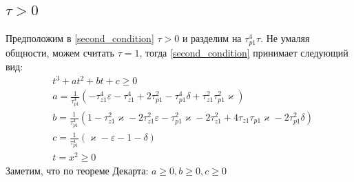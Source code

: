\documentclass[a4paper]{article}
\begin{document}
\subsection{$\tau > 0$}
Предположим в \eqref{second_condition} $\tau > 0$ и разделим на $\tau_{p1}^4\tau$. Не умаляя общности, можем считать $\tau = 1$, тогда \eqref{second_condition} принимает следующий вид:
 \begin{equation}
 \begin{aligned}
&t^3 +at^2 +bt + c  \geq 0\\
&a = \frac{1}{\tau_{p1}^4}(- \tau_{z1}^4\varepsilon - \tau_{z1}^4 + 2\tau_{p1}^2- \tau_{p1}^4\delta + \tau_{z1}^2\tau_{p1}^2\varkappa)\\
&b = \frac{1}{\tau_{p1}^4}( 1- \tau_{z1}^2\varkappa - 2\tau_{z1}^2\varepsilon - \tau_{p1}^2\varkappa- 2\tau_{z1}^2+ 4\tau_{z1}\tau_{p1}\varkappa- 2\tau_{p1}^2\delta)\\
&c = \frac{1}{\tau_{p1}^4}(\varkappa-\varepsilon - 1 - \delta)\\
&t = x^2 \geq 0
 \end{aligned}
\end{equation}
Заметим, что по теореме Декарта: $a \geq 0, b \geq 0, c \geq 0$
\end{document}

